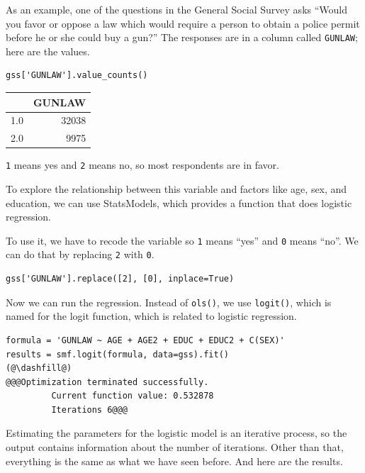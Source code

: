 As an example, one of the questions in the General Social Survey asks
``Would you favor or oppose a law which would require a person to obtain
a police permit before he or she could buy a gun?'' The responses are in
a column called \passthrough{\lstinline!GUNLAW!}; here are the values.

\begin{lstlisting}[]
gss['GUNLAW'].value_counts()
\end{lstlisting}

\begin{tabular}{lr}
\midrule
{} &  GUNLAW \\
\midrule
1.0 &   32038 \\
2.0 &    9975 \\
\midrule
\end{tabular}

\passthrough{\lstinline!1!} means yes and \passthrough{\lstinline!2!}
means no, so most respondents are in favor.

To explore the relationship between this variable and factors like age,
sex, and education, we can use StatsModels, which provides a function
that does logistic regression.

To use it, we have to recode the variable so \passthrough{\lstinline!1!}
means ``yes'' and \passthrough{\lstinline!0!} means ``no''. We can do
that by replacing \passthrough{\lstinline!2!} with
\passthrough{\lstinline!0!}.

\begin{lstlisting}[]
gss['GUNLAW'].replace([2], [0], inplace=True)
\end{lstlisting}

Now we can run the regression. Instead of
\passthrough{\lstinline!ols()!}, we use
\passthrough{\lstinline!logit()!}, which is named for the logit
function, which is related to logistic regression.

\begin{lstlisting}[]
formula = 'GUNLAW ~ AGE + AGE2 + EDUC + EDUC2 + C(SEX)'
results = smf.logit(formula, data=gss).fit()
(@\dashfill@)
@@@Optimization terminated successfully.
         Current function value: 0.532878
         Iterations 6@@@
\end{lstlisting}

Estimating the parameters for the logistic model is an iterative
process, so the output contains information about the number of
iterations. Other than that, everything is the same as what we have seen
before. And here are the results.

